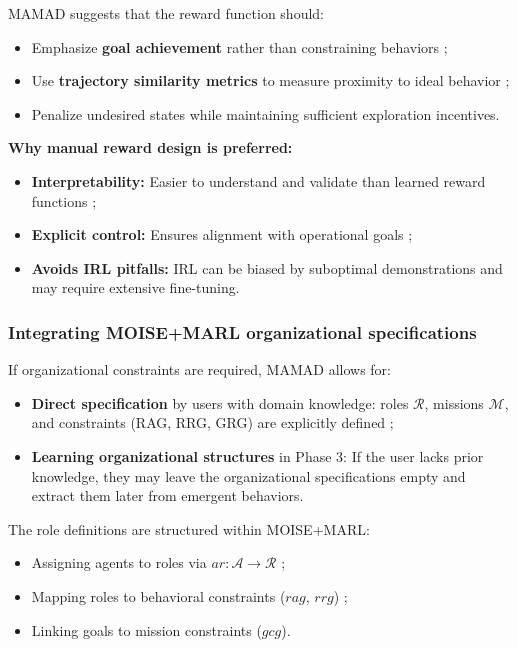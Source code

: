 \documentclass[pdflatex,sn-mathphys-num]{sn-jnl}%
\theoremstyle{thmstyleone}%
\theoremstyle{thmstyletwo}%
\theoremstyle{thmstylethree}%
\begin{document}
MAMAD suggests that the reward function should:
\begin{itemize}
    \item Emphasize \textbf{goal achievement} rather than constraining behaviors ;
    \item Use \textbf{trajectory similarity metrics} to measure proximity to ideal behavior ;
    \item Penalize undesired states while maintaining sufficient exploration incentives.
\end{itemize}

\noindent \textbf{Why manual reward design is preferred:}
\begin{itemize}
    \item \textbf{Interpretability:} Easier to understand and validate than learned reward functions ;
    \item \textbf{Explicit control:} Ensures alignment with operational goals ;
    \item \textbf{Avoids IRL pitfalls:} IRL can be biased by suboptimal demonstrations and may require extensive fine-tuning.
\end{itemize}

\subsubsection{Integrating MOISE+MARL organizational specifications}
If organizational constraints are required, MAMAD allows for:
\begin{itemize}
    \item \textbf{Direct specification} by users with domain knowledge: roles $\mathcal{R}$, missions $\mathcal{M}$, and constraints (RAG, RRG, GRG) are explicitly defined ;
    \item \textbf{Learning organizational structures} in Phase 3: If the user lacks prior knowledge, they may leave the organizational specifications empty and extract them later from emergent behaviors.
\end{itemize}

The role definitions are structured within MOISE+MARL:
\begin{itemize}
    \item Assigning agents to roles via $ar: \mathcal{A} \to \mathcal{R}$ ;
    \item Mapping roles to behavioral constraints ($rag$, $rrg$) ;
    \item Linking goals to mission constraints ($gcg$).
\end{itemize}
\end{document}
